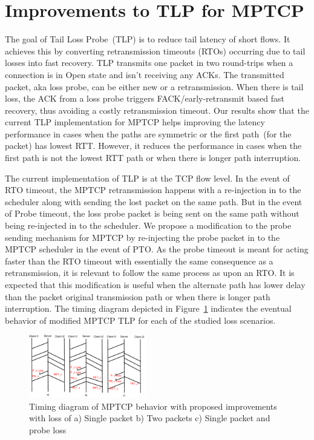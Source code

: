 \documentclass[10pt,conference,compsoc]{IEEEtran}
\begin{document}
\section{Improvements to TLP for MPTCP}\label{impr}
The goal of Tail Loss Probe~(TLP) is to reduce tail latency of short flows. It achieves this by converting retransmission timeouts (RTOs) occurring due to tail losses into fast recovery. TLP transmits one packet in two round-trips when a connection is in Open state and isn't receiving any ACKs. The transmitted packet, aka loss probe, can be either new or a retransmission. When there is tail loss, the ACK from a loss probe triggers FACK/early-retransmit based fast recovery, thus avoiding a costly retransmission timeout. Our results show that the current TLP implementation for MPTCP helps improving the latency performance in cases when the paths are symmetric or the first path~(for the packet) has lowest RTT. However, it reduces the performance in cases when the first path is not the lowest RTT path or when there is longer path interruption.

The current implementation of TLP is at the TCP flow level. In the event of RTO timeout, the MPTCP retransmission happens with a re-injection in to the scheduler along with sending the lost packet on the same path. But in the event of Probe timeout, the loss probe packet is being sent on the same path without being re-injected in to the scheduler. We propose a modification to the probe sending mechanism for MPTCP by re-injecting the probe packet in to the MPTCP scheduler in the event of PTO. As the probe timeout is meant for acting faster than the RTO timeout with essentially the same consequence as a retransmission, it is relevant to follow the same process as upon an RTO. It is expected that this modification is useful when the alternate path has lower delay than the packet original transmission path or when there is longer path interruption. The timing diagram depicted in Figure~\ref{timingNew} indicates the eventual behavior of modified MPTCP TLP for each of the studied loss scenarios.

\begin{figure}[!ht]
\begin{center}
\includegraphics[angle=0, width=0.46\textwidth]{images/timingER3NewTLP1.pdf}
\end{center}
\caption{Timing diagram of MPTCP behavior with proposed improvements with loss of a) Single packet b) Two packets c) Single packet and probe loss}\label{timingNew}
\end{figure}
\end{document}
